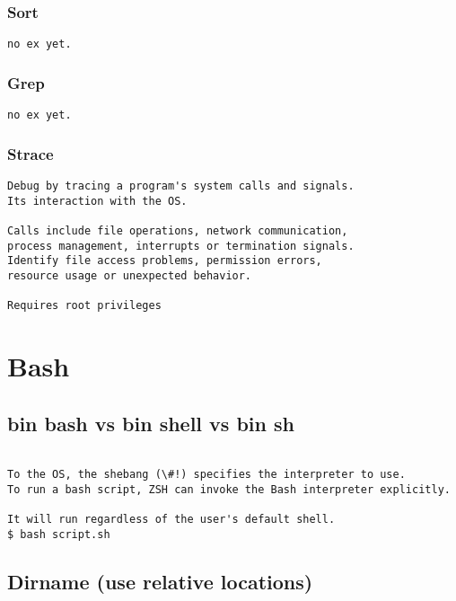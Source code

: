 \subsection{Sort}

\begin{verbatim}
no ex yet.
\end{verbatim}

\subsection{Grep}

\begin{verbatim}
no ex yet.
\end{verbatim}

\subsection{Strace}

\begin{verbatim}
Debug by tracing a program's system calls and signals.
Its interaction with the OS.

Calls include file operations, network communication,
process management, interrupts or termination signals.
Identify file access problems, permission errors,
resource usage or unexpected behavior. 

Requires root privileges
\end{verbatim}

\chapter{Bash}

\section{bin bash vs bin shell vs bin sh}

\begin{verbatim}

To the OS, the shebang (\#!) specifies the interpreter to use.
To run a bash script, ZSH can invoke the Bash interpreter explicitly.

It will run regardless of the user's default shell.
$ bash script.sh
\end{verbatim}

\section{Dirname (use relative locations)}

